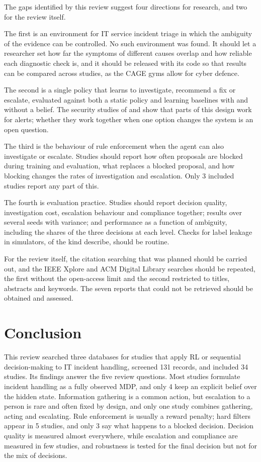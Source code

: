 \documentclass[pdflatex,sn-basic]{sn-jnl}
\begin{document}
The gaps identified by this review suggest four directions for research, and two for the review itself.

The first is an environment for IT service incident triage in which the ambiguity of the evidence can be controlled. No such environment was found. It should let a researcher set how far the symptoms of different causes overlap and how reliable each diagnostic check is, and it should be released with its code so that results can be compared across studies, as the CAGE gyms allow for cyber defence.

The second is a single policy that learns to investigate, recommend a fix or escalate, evaluated against both a static policy and learning baselines with and without a belief. The security studies of \citet{sahin2026} and \citet{kovtun2026} show that parts of this design work for alerts; whether they work together when one option changes the system is an open question.

The third is the behaviour of rule enforcement when the agent can also investigate or escalate. Studies should report how often proposals are blocked during training and evaluation, what replaces a blocked proposal, and how blocking changes the rates of investigation and escalation. Only 3 included studies report any part of this.

The fourth is evaluation practice. Studies should report decision quality, investigation cost, escalation behaviour and compliance together; results over several seeds with variance; and performance as a function of ambiguity, including the shares of the three decisions at each level. Checks for label leakage in simulators, of the kind \citet{sahin2026} describe, should be routine.

For the review itself, the citation searching that was planned should be carried out, and the IEEE Xplore and ACM Digital Library searches should be repeated, the first without the open-access limit and the second restricted to titles, abstracts and keywords. The seven reports that could not be retrieved should be obtained and assessed.

\section{Conclusion}
\label{sec:conclusion}

This review searched three databases for studies that apply RL or sequential decision-making to IT incident handling, screened 131 records, and included 34 studies. Its findings answer the five review questions. Most studies formulate incident handling as a fully observed MDP, and only 4 keep an explicit belief over the hidden state. Information gathering is a common action, but escalation to a person is rare and often fixed by design, and only one study combines gathering, acting and escalating. Rule enforcement is usually a reward penalty; hard filters appear in 5 studies, and only 3 say what happens to a blocked decision. Decision quality is measured almost everywhere, while escalation and compliance are measured in few studies, and robustness is tested for the final decision but not for the mix of decisions.
\end{document}
